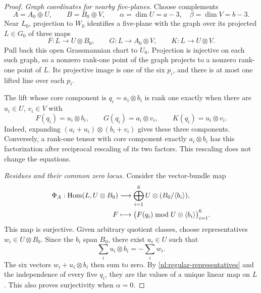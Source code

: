 \begin{proof}
\medskip
\emph{Graph coordinates for nearby five-planes.}
Choose complements
\[
 A=A_0\oplus U,\qquad B=B_0\oplus V,\qquad
 \alpha=\dim U=a-3,\quad \beta=\dim V=b-3.
\]
Near $L_0$, projection to $W_0$ identifies a five-plane with the graph
over its projected $L\in G_0$ of three maps
\begin{equation}\label{nl:graph-maps}
 F:L\longrightarrow U\otimes B_0,\qquad
 G:L\longrightarrow A_0\otimes V,\qquad
 K:L\longrightarrow U\otimes V.
\end{equation}
Pull back this open Grassmannian chart to $U_0$.
Projection is injective on each such graph, so a nonzero rank-one
point of the graph projects to a nonzero rank-one point of $L$.
Its projective image is one of the six $p_i$, and there is at most one
lifted line over each $p_i$.

The lift whose core component is $q_i=a_i\otimes b_i$ is rank one
exactly when there are $u_i\in U$, $v_i\in V$ with
\begin{equation}\label{nl:lift-equations}
 F(q_i)=u_i\otimes b_i,\qquad
 G(q_i)=a_i\otimes v_i,\qquad
 K(q_i)=u_i\otimes v_i.
\end{equation}
Indeed, expanding $(a_i+u_i)\otimes(b_i+v_i)$ gives these three
components. Conversely, a rank-one tensor with core component exactly
$a_i\otimes b_i$ has this factorization after reciprocal rescaling of
its two factors. This rescaling does not change the equations.

\medskip
\emph{Residues and their common zero locus.}
Consider the vector-bundle map
\begin{equation}\label{nl:residue-map}
 \begin{split}
 \Phi_A:\operatorname{Hom}(L,U\otimes B_0)&\longrightarrow
           \bigoplus_{i=1}^6 U\otimes(B_0/\langle b_i\rangle),\\
 F&\longmapsto
       \bigl(F(q_i)\bmod U\otimes\langle b_i\rangle\bigr)_{i=1}^6.
 \end{split}
\end{equation}
This map is surjective. Given arbitrary quotient classes, choose
representatives $w_i\in U\otimes B_0$. Since the $b_i$ span $B_0$,
there exist $u_i\in U$ such that
\[
 \sum_i u_i\otimes b_i=-\sum_iw_i.
\]
The six vectors $w_i+u_i\otimes b_i$ then sum to zero. By
\eqref{nl:regular-representatives} and the independence of every five
$q_i$, they are the values of a unique linear map on $L$. This also
proves surjectivity when $\alpha=0$.


\end{proof}
